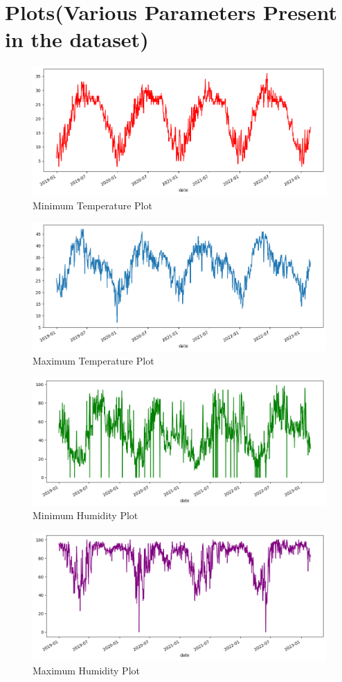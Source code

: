 \section{Plots(Various Parameters Present in the dataset)}
\begin{figure}[htbp]
     \centering
     \includegraphics[width=0.8\linewidth]{images/outputs/temp_min.png}
     \caption{ Minimum Temperature Plot}
 \end{figure}
 \begin{figure}[htbp]
     \centering
     \includegraphics[width=0.8\linewidth]{images/outputs/temp_max.png}
     \caption{ Maximum Temperature Plot}
 \end{figure}
 \begin{figure}
     \centering
     \includegraphics[width=0.8\linewidth]{images/outputs/hum_min.png}
     \caption{ Minimum Humidity Plot}
 \end{figure}
 \begin{figure}[htbp]
     \centering
     \includegraphics[width=0.8\linewidth]{images/outputs/hum_max.png}
     \caption{ Maximum Humidity Plot}
 \end{figure}

